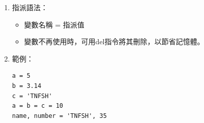 \documentclass[a4paper,12pt]{article}
\begin{document}
\begin{enumerate}
\item 指派語法： 
\label{sec:orgc24164c}
\begin{itemize}
\item 變數名稱 = 指派值\\
\item 變數不再使用時，可用del指令將其刪除，以節省記憶體。\\
\end{itemize}

\item 範例：
\label{sec:orgd93b46c}
\lstset{breaklines=true,language=Python,label= ,caption= ,captionpos=b,firstnumber=1,numbers=left}
\begin{lstlisting}
a = 5
b = 3.14
c = 'TNFSH'
a = b = c = 10
name, number = 'TNFSH', 35
\end{lstlisting}
\end{enumerate}
\end{document}
